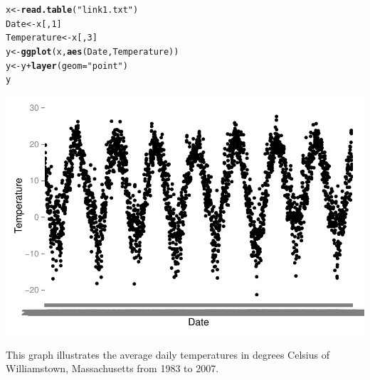 \documentclass{article}\usepackage{graphicx, color}
\makeatletter
\def\maxwidth{ %
  \ifdim\Gin@nat@width>\linewidth
    \linewidth
  \else
    \Gin@nat@width
  \fi
}
\newcommand{\hlfunctioncall}[1]{\textcolor[rgb]{0.501960784313725,0,0.329411764705882}{\textbf{#1}}}%
\newcommand{\hlstring}[1]{\textcolor[rgb]{0.6,0.6,1}{#1}}%
\newenvironment{kframe}{%
 \def\at@end@of@kframe{}%
 \ifinner\ifhmode%
  \def\at@end@of@kframe{\end{minipage}}%
  \begin{minipage}{\columnwidth}%
 \fi\fi%
 \def\FrameCommand##1{\hskip\@totalleftmargin \hskip-\fboxsep
 \colorbox{shadecolor}{##1}\hskip-\fboxsep
     \hskip-\linewidth \hskip-\@totalleftmargin \hskip\columnwidth}%
 \MakeFramed {\advance\hsize-\width
   \@totalleftmargin\z@ \linewidth\hsize
   \@setminipage}}%
 {\par\unskip\endMakeFramed%
 \at@end@of@kframe}
\newenvironment{knitrout}{}{} %
\makeatother
\begin{document}
\begin{knitrout}
\color{fgcolor}\begin{kframe}
\begin{alltt}
x <- \hlfunctioncall{read.table}(\hlstring{"link1.txt"})
Date <- x[, 1]
Temperature <- x[, 3]
y <- \hlfunctioncall{ggplot}(x, \hlfunctioncall{aes}(Date, Temperature))
y <- y + \hlfunctioncall{layer}(geom = \hlstring{"point"})
y
\end{alltt}
\end{kframe}
\includegraphics[width=\maxwidth]{figure/graph2} 

\end{knitrout}


This graph illustrates the average daily temperatures in degrees Celsius of
Williamstown, Massachusetts from 1983 to 2007.
\end{document}
